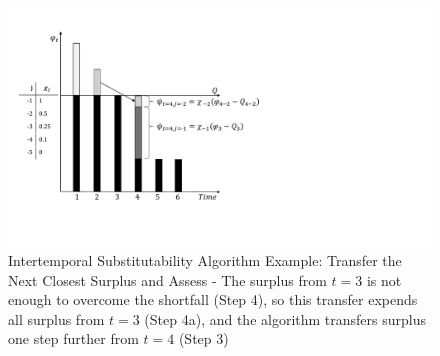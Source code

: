 \documentclass[preprint,12pt]{elsarticle}
\begin{document}
\begin{figure}[h]
  \centering\includegraphics[width=\textwidth]{Chi2-3.pdf}
  \caption{Intertemporal Substitutability Algorithm Example: Transfer
    the Next Closest Surplus and Assess - The surplus from $t=3$ is
    not enough to overcome the shortfall (Step 4), so this transfer
    expends all surplus from $t=3$ (Step 4a), and the algorithm
    transfers surplus one step further from $t=4$ (Step 3)}
  \label{f:Chi2-3}
\end{figure}
\end{document}
